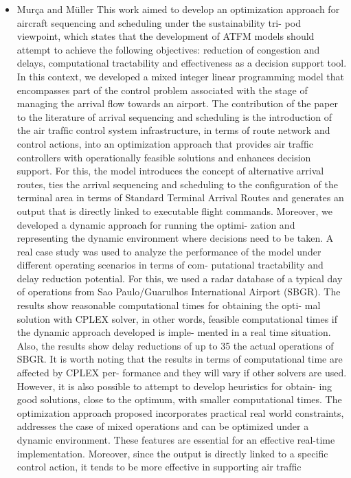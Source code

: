 \documentclass{aer1315-pretty}
\begin{document}
\begin{itemize}
\item Mur\c{c}a and M{\"u}ller \cite{Murca:2015}
    This work aimed to develop an optimization approach for aircraft sequencing and scheduling under the sustainability tri-
pod viewpoint, which states that the development of ATFM models should attempt to achieve the following objectives:
reduction of congestion and delays, computational tractability and effectiveness as a decision support tool. In this context,
we developed a mixed integer linear programming model that encompasses part of the control problem associated with the
stage of managing the arrival ﬂow towards an airport. The contribution of the paper to the literature of arrival sequencing
and scheduling is the introduction of the air trafﬁc control system infrastructure, in terms of route network and control
actions, into an optimization approach that provides air trafﬁc controllers with operationally feasible solutions and enhances
decision support. For this, the model introduces the concept of alternative arrival routes, ties the arrival sequencing and
scheduling to the conﬁguration of the terminal area in terms of Standard Terminal Arrival Routes and generates an output
that is directly linked to executable ﬂight commands. Moreover, we developed a dynamic approach for running the optimi-
zation and representing the dynamic environment where decisions need to be taken.
    A real case study was used to analyze the performance of the model under different operating scenarios in terms of com-
putational tractability and delay reduction potential. For this, we used a radar database of a typical day of operations from
Sao Paulo/Guarulhos International Airport (SBGR). The results show reasonable computational times for obtaining the opti-
mal solution with CPLEX solver, in other words, feasible computational times if the dynamic approach developed is imple-
mented in a real time situation. Also, the results show delay reductions of up to 35%
the actual operations of SBGR. It is worth noting that the results in terms of computational time are affected by CPLEX per-
formance and they will vary if other solvers are used. However, it is also possible to attempt to develop heuristics for obtain-
ing good solutions, close to the optimum, with smaller computational times.
    The optimization approach proposed incorporates practical real world constraints, addresses the case of mixed operations
and can be optimized under a dynamic environment. These features are essential for an effective real-time implementation.
Moreover, since the output is directly linked to a speciﬁc control action, it tends to be more effective in supporting air trafﬁc

\end{itemize}
\end{document}
